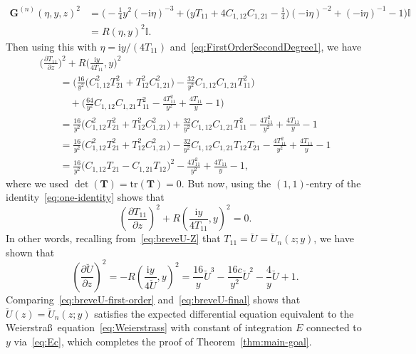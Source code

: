 \documentclass[pdftex]{sigma}
\numberwithin{equation}{section}
\begin{document}
\begin{align*}
\mathbf{G}^{(n)}(\eta,y,z)^2 &{}= \bigl(-\tfrac{1}{4}y^2(-\mathrm{i}\eta)^{-3} + \bigl(yT_{11}+4C_{1,12}C_{1,21}-\tfrac{1}{4}\bigr)(-\mathrm{i}\eta)^{-2}+(-\mathrm{i}\eta)^{-1}-1\bigr)\mathbb{I} \\
&{}=R(\eta,y)^2\mathbb{I}.
\end{align*}
Then using this with $\eta=\mathrm{i} y/(4T_{11})$ and~\eqref{eq:FirstOrderSecondDegree1}, we have
\begin{gather*}
\bigg(\frac{\partial T_{11}}{\partial z}\bigg)^2+R\bigg(\frac{\mathrm{i} y}{4T_{11}},y\bigg)^2\\
\qquad {} =
\bigg(\frac{16}{y^2}\bigl(C_{1,12}^2T_{21}^2+T_{12}^2C_{1,21}^2\bigr)-\frac{32}{y^2}C_{1,12}C_{1,21}T_{11}^2\bigg) \\
\qquad\quad {}
 +\bigg(\frac{64}{y^2}C_{1,12}C_{1,21}T_{11}^2-\frac{4T_{11}^2}{y^2}+\frac{4T_{11}}{y}-1\bigg)\\
\qquad{} = \frac{16}{y^2}\bigl(C_{1,12}^2T_{21}^2+T_{12}^2C_{1,21}^2\bigr)+\frac{32}{y^2}C_{1,12}C_{1,21}T_{11}^2 -\frac{4T_{11}^2}{y^2}+\frac{4T_{11}}{y}-1\\
\qquad{} = \frac{16}{y^2}\bigl(C_{1,12}^2T_{21}^2+T_{12}^2C_{1,21}^2\bigr)-\frac{32}{y^2}C_{1,12}C_{1,21}T_{12}T_{21}
 -\frac{4T_{11}^2}{y^2}+\frac{4T_{11}}{y}-1\\
\qquad{} = \frac{16}{y^2}\bigl(C_{1,12}T_{21}-C_{1,21}T_{12}\bigr)^2-\frac{4T_{11}^2}{y^2}+\frac{4T_{11}}{y}-1,
\end{gather*}
where we used $\det(\mathbf{T})=\mathrm{tr}(\mathbf{T})=0$. But now, using the $(1,1)$-entry of the identity~\eqref{eq:one-identity} shows that
\begin{equation*}
\left(\frac{\partial T_{11}}{\partial z}\right)^2+R\left(\frac{\mathrm{i} y}{4T_{11}},y\right)^2=0.
\end{equation*}
In other words, recalling from~\eqref{eq:breveU-Z} that $T_{11}=\breve{U}=\breve{U}_n(z;y)$, we have shown that
\begin{equation}
\left(\frac{\partial\breve{U}}{\partial z}\right)^2=-R\left(\frac{\mathrm{i} y}{4\breve{U}},y\right)^2 = \frac{16}{y}\breve{U}^3-\frac{16c}{y^2}\breve{U}^2-\frac{4}{y}\breve{U}+1.
\label{eq:breveU-final}
\end{equation}
Comparing~\eqref{eq:breveU-first-order} and~\eqref{eq:breveU-final} shows that $\breve{U}(z)=\breve{U}_n(z;y)$ satisfies the expected differential equation equivalent to the Weierstra\ss\ equation~\eqref{eq:Weierstrass} with constant of integration $E$ connected to $y$ via~\eqref{eq:Ec},
which completes the proof of Theorem~\ref{thm:main-goal}.
\end{document}
